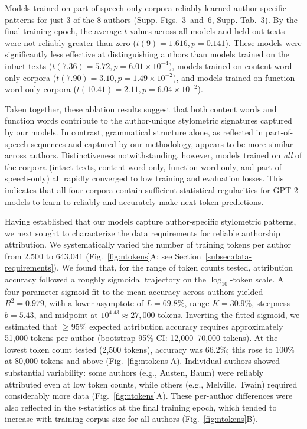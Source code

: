 \documentclass[11pt]{article}
\newcommand{\crossentropyPOS}{{3}}
\newcommand{\ttestsPOS}{{6}}
\newcommand{\authortablePOS}{{3}}
\begin{document}
Models trained on part-of-speech-only corpora reliably learned author-specific
patterns for just 3 of the 8 authors (Supp.
Figs.~\crossentropyPOS~and~\ttestsPOS, Supp. Tab.~\authortablePOS). By the
final training epoch, the average $t$-values across all models and held-out
texts were not reliably greater than zero ($t(9) = 1.616, p = 0.141$). These
models were significantly less effective at distinguishing authors than models
trained on the intact texts ($t(7.36) = 5.72, p = 6.01 \times 10^{-4}$), models
trained on content-word-only corpora ($t(7.90) = 3.10, p = 1.49 \times
10^{-2}$), and models trained on function-word-only corpora ($t(10.41) = 2.11,
p = 6.04 \times 10^{-2}$).

Taken together, these ablation results suggest that both content words and
function words contribute to the author-unique stylometric signatures captured
by our models. In contrast, grammatical structure alone, as reflected in
part-of-speech sequences and captured by our methodology, appears to be more
similar across authors. Distinctiveness notwithstanding, however, models
trained on \textit{all} of the corpora (intact texts, content-word-only,
function-word-only, and part-of-speech-only) all rapidly converged to low
training and evaluation losses. This indicates that all four corpora contain
sufficient statistical regularities for GPT-2 models to learn to reliably
and accurately make next-token predictions.

Having established that our models capture author-specific stylometric
patterns, we next sought to characterize the data requirements for reliable
authorship attribution. We systematically varied the number of training tokens
per author from 2,500 to 643,041 (Fig.~\ref{fig:ntokens}A; see
Section~\ref{subsec:data-requirements}). We found that, for the range of token
counts tested, attribution accuracy followed a roughly sigmoidal trajectory on
the $\log_{10}$-token scale. A four-parameter sigmoid fit to the mean accuracy
across authors yielded $R^2 = 0.979$, with a lower asymptote of $L = 69.8\%$,
range $K = 30.9\%$, steepness $b = 5.43$, and midpoint at $10^{4.43} \approx
27{,}000$ tokens. Inverting the fitted sigmoid, we estimated that $\geq 95\%$
expected attribution accuracy requires approximately 51,000 tokens per author
(bootstrap 95\% CI: 12,000--70,000 tokens). At the lowest token count tested
(2,500 tokens), accuracy was $66.2\%$; this rose to $100\%$ at 80,000 tokens
and above (Fig.~\ref{fig:ntokens}A). Individual authors showed substantial
variability: some authors (e.g., Austen, Baum) were reliably attributed even at
low token counts, while others (e.g., Melville, Twain) required considerably
more data (Fig.~\ref{fig:ntokens}A). These per-author differences were also
reflected in the $t$-statistics at the final training epoch, which tended to
increase with training corpus size for all authors (Fig.~\ref{fig:ntokens}B).
\end{document}
